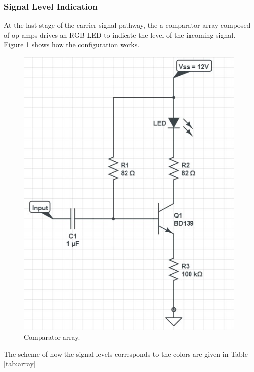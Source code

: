 \documentclass[a4paper,10pt]{IEEEtran}
\begin{document}
\subsubsection{Signal Level Indication}
At the last stage of the carrier signal pathway, the a comparator array composed of op-amps drives an RGB LED to indicate the level of the incoming signal. Figure \ref{array} shows how the configuration works.
\begin{figure}[htbp!]
    \centering
    \includegraphics[width = 1\linewidth]{Led Driver Circuit.jpg}
    \caption{Comparator array.}
    \label{array}
\end{figure}
The scheme of how the signal levels corresponds to the colors are given in Table \ref{tab:array}
\end{document}
